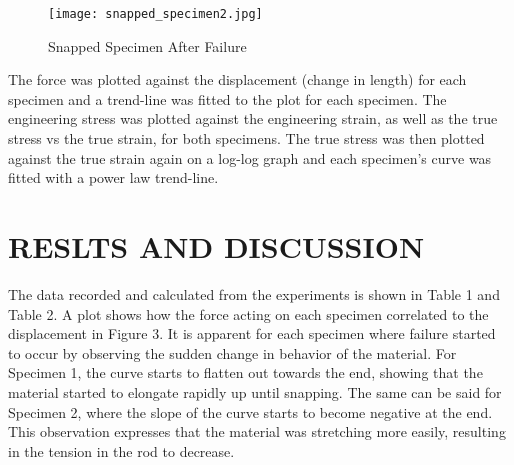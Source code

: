 \documentclass[12pt]{article}
\begin{document}
\newpage

\begin{figure}[h!]  
  \centering
    \texttt{[image: snapped\_specimen2.jpg]}
    \caption{Snapped Specimen After Failure}
\end{figure}


The force was plotted against the displacement (change in length) for each specimen and a trend-line was fitted to the plot for each specimen. The engineering stress was plotted against the engineering strain, as well as the true stress vs the true strain, for both specimens. The true stress was then plotted against the true strain again on a log-log graph and each specimen's curve was fitted with a power law trend-line.
\bigskip


\section*{\fontsize{12}{12}\selectfont RESLTS AND DISCUSSION}
The data recorded and calculated from the experiments is shown in Table 1 and Table 2. A plot shows how the force acting on each specimen correlated to the displacement in Figure 3. It is apparent for each specimen where failure started to occur by observing the sudden change in behavior of the material. For Specimen 1, the curve starts to flatten out towards the end, showing that the material started to elongate rapidly up until snapping. The same can be said for Specimen 2, where the slope of the curve starts to become negative at the end. This observation expresses that the material was stretching more easily, resulting in the tension in the rod to decrease. 

\newpage
\end{document}

